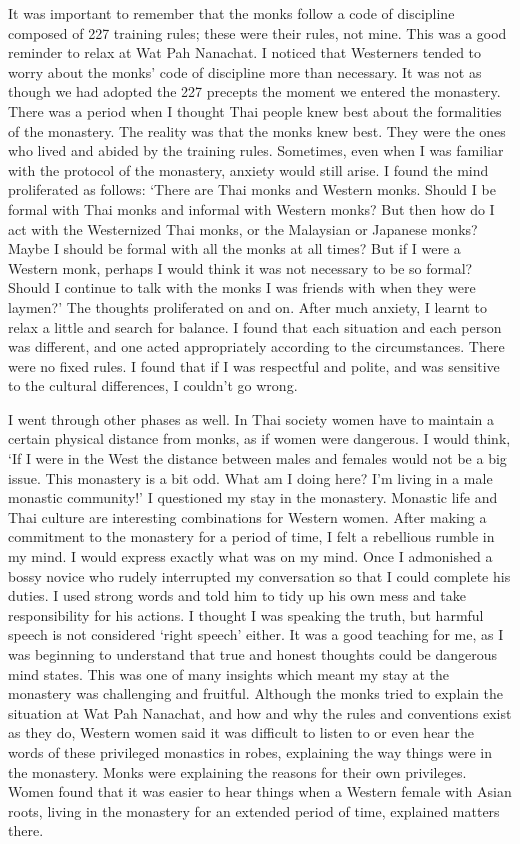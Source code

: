 It was important to remember that the monks follow a code of discipline
composed of 227 training rules; these were their rules, not mine. This
was a good reminder to relax at Wat Pah Nanachat. I noticed that
Westerners tended to worry about the monks' code of discipline more than
necessary. It was not as though we had adopted the 227 precepts the
moment we entered the monastery. There was a period when I thought Thai
people knew best about the formalities of the monastery. The reality was
that the monks knew best. They were the ones who lived and abided by the
training rules. Sometimes, even when I was familiar with the protocol of
the monastery, anxiety would still arise. I found the mind proliferated
as follows: `There are Thai monks and Western monks. Should I be formal
with Thai monks and informal with Western monks? But then how do I act
with the Westernized Thai monks, or the Malaysian or Japanese monks?
Maybe I should be formal with all the monks at all times? But if I were
a Western monk, perhaps I would think it was not necessary to be so
formal? Should I continue to talk with the monks I was friends with when
they were laymen?' The thoughts proliferated on and on. After much
anxiety, I learnt to relax a little and search for balance. I found that
each situation and each person was different, and one acted
appropriately according to the circumstances. There were no fixed rules.
I found that if I was respectful and polite, and was sensitive to the
cultural differences, I couldn't go wrong.

I went through other phases as well. In Thai society women have to
maintain a certain physical distance from monks, as if women were
dangerous. I would think, `If I were in the West the distance between
males and females would not be a big issue. This monastery is a bit odd.
What am I doing here? I'm living in a male monastic community!' I
questioned my stay in the monastery. Monastic life and Thai culture are
interesting combinations for Western women. After making a commitment to
the monastery for a period of time, I felt a rebellious rumble in my
mind. I would express exactly what was on my mind. Once I admonished a
bossy novice who rudely interrupted my conversation so that I could
complete his duties. I used strong words and told him to tidy up his own
mess and take responsibility for his actions. I thought I was speaking
the truth, but harmful speech is not considered `right speech' either.
It was a good teaching for me, as I was beginning to understand that
true and honest thoughts could be dangerous mind states. This was one of
many insights which meant my stay at the monastery was challenging and
fruitful. Although the monks tried to explain the situation at Wat Pah
Nanachat, and how and why the rules and conventions exist as they do,
Western women said it was difficult to listen to or even hear the words
of these privileged monastics in robes, explaining the way things were
in the monastery. Monks were explaining the reasons for their own
privileges. Women found that it was easier to hear things when a Western
female with Asian roots, living in the monastery for an extended period
of time, explained matters there.

